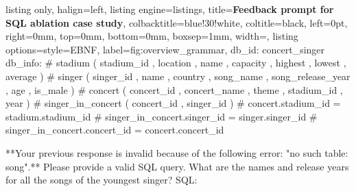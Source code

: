 \begin{tcblisting}{
    listing only, 
    halign=left,
    listing engine=listings,
    title=\textbf{\small Feedback prompt for SQL ablation case study},
    colbacktitle=blue!30!white, 
    coltitle=black,
    left=0pt,               %
    right=0mm,              %
    top=0mm,                %
    bottom=0mm,             %
    boxsep=1mm,
    width=\textwidth,
    listing options={style=EBNF},
    label={fig:overview_grammar},
}
db_id: concert_singer
db_info: # stadium ( stadium_id , location , name , capacity , highest , lowest , average )
# singer ( singer_id , name , country , song_name , song_release_year , age , is_male )
# concert ( concert_id , concert_name , theme , stadium_id , year )
# singer_in_concert ( concert_id , singer_id )
# concert.stadium_id = stadium.stadium_id
# singer_in_concert.singer_id = singer.singer_id
# singer_in_concert.concert_id = concert.concert_id

**Your previous response is invalid because of the following error: "no such table: song".**
Please provide a valid SQL query. 
What are the names and release years for all the songs of the youngest singer? 
SQL:
\end{tcblisting}
\label{fig:database_schema_query}
